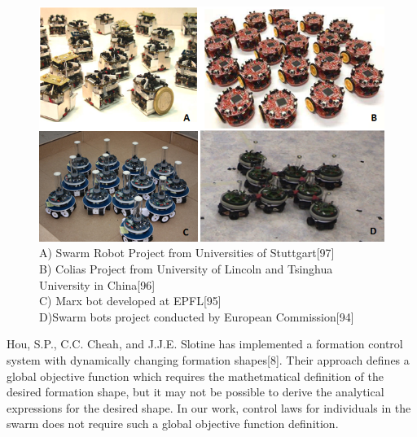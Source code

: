 \begin{figure}[H]
\captionsetup{format=hang,justification=centerfirst}
\caption{
A) Swarm Robot Project from Universities of Stuttgart[97]  \\
B) Colias Project from University of Lincoln and Tsinghua\\ University in China[96]\\
C) Marx bot developed at EPFL[95] \\
D)Swarm bots project conducted by  European Commission[94]}

\centering
\includegraphics[scale = 0.8]{mobilerobots}
\end{figure}

    
    
  
    
Hou, S.P., C.C. Cheah, and J.J.E. Slotine has implemented a formation control system with dynamically changing formation shapes[8]. Their approach defines a global objective function which requires the mathetmatical definition of the desired formation shape, but it may not be possible to derive the analytical expressions for the desired shape. In our work, control laws for individuals in the swarm does not require such a global objective function definition.

